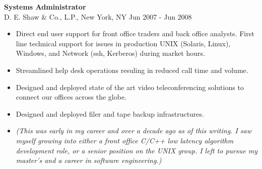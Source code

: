 \textbf{Systems Administrator} \\
D. E. Shaw \& Co., L.P., New York, NY \hfill Jun 2007 - Jun 2008
\begin{itemize}  \itemsep -2pt %
\item Direct end user support for front office traders and back office
      analysts. First line technical support for issues in production
      UNIX (Solaris, Linux), Windows, and Network (ssh, Kerberos) during
      market hours.
\item Streamlined help desk operations resuling in reduced call time and
      volume.
\item Designed and deployed state of the art video teleconferencing
      solutions to connect our offices across the globe.
\item Designed and deployed filer and tape backup infrastructures.
\item \textit{(This was early in my career and over a decade ago as of this
      writing. I saw myself growing into either a front office C/C++
      low latency algorithm development role, or a senior position
      on the UNIX group. I left to pursue my master's and a career
      in software engineering.)}
\end{itemize}
